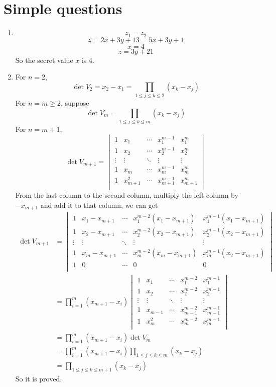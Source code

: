 \documentclass{article}
\begin{document}
	\section{Simple questions}
	\begin{enumerate}
		\item
		$$z_1=z_2$$
		$$z=2x+3y+13=5x+3y+1$$
		$$x=4$$
		$$z=3y+21$$
		So the secret value $x$ is 4.
		\item
		For $n=2$, $$\det V_2=x_2-x_1=\prod_{1\leqslant j\leqslant k\leqslant 2}(x_k-x_j)$$
		For $n=m\geqslant 2$, suppose $$\det V_m=\prod_{1\leqslant j\leqslant k\leqslant m}(x_k-x_j)$$
		For $n=m+1$, 
		$$\det V_{m+1}=
		\begin{vmatrix}
			1 & x_1 & \cdots & x_1^{m-1} & x_1^m \\
			1 & x_2 & \cdots & x_2^{m-1} & x_2^m \\
			\vdots & \vdots & \ddots & \vdots & \vdots \\
			1 & x_m & \cdots & x_m^{m-1} & x_m^m \\
			1 & x_{m+1}^2 & \cdots & x_{m+1}^{m-1} & x_{m+1}^m \\
		\end{vmatrix}
		$$
		From the last column to the second column, multiply the left column by $-x_{m+1}$ and add it to that column, we can get
		$$
		\begin{aligned}
			\det V_{m+1}&=
			\begin{vmatrix}
				1 & x_1-x_{m+1} & \cdots & x_1^{m-2}(x_1-x_{m+1}) & x_1^{m-1}(x_1-x_{m+1}) \\
				1 & x_2-x_{m+1} & \cdots & x_2^{m-2}(x_2-x_{m+1}) & x_2^{m-1}(x_2-x_{m+1}) \\
				\vdots & \vdots & \ddots & \vdots & \vdots \\
				1 & x_m-x_{m+1} & \cdots & x_m^{m-2}(x_m-x_{m+1}) & x_m^{m-1}(x_2-x_{m+1}) \\
				1 & 0 & \cdots & 0 & 0 \\
			\end{vmatrix}\\
			&=\prod_{i=1}^m(x_{m+1}-x_i)
			\begin{vmatrix}
				1 & x_1 & \cdots & x_1^{m-2} & x_1^{m-1} \\
				1 & x_2 & \cdots & x_2^{m-2} & x_2^{m-1} \\
				\vdots & \vdots & \ddots & \vdots & \vdots \\
				1 & x_{m-1} & \cdots & x_{m-1}^{m-2} & x_{m-1}^{m-1} \\
				1 & x_m^2 & \cdots & x_m^{m-2} & x_m^{m-1} \\
			\end{vmatrix}\\
			&=\prod_{i=1}^m(x_{m+1}-x_i)\det V_m\\
			&=\prod_{i=1}^m(x_{m+1}-x_i)\prod_{1\leqslant j\leqslant k\leqslant m}(x_k-x_j)\\
			&=\prod_{1\leqslant j\leqslant k\leqslant m+1}(x_k-x_j)
		\end{aligned}
		$$
		So it is proved.
	\end{enumerate}
	
\end{document}
